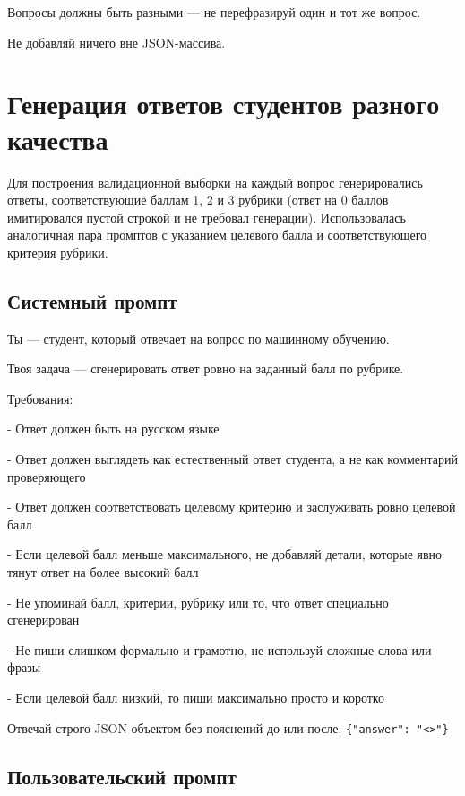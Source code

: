 \vspace{1em}
Вопросы должны быть разными — не перефразируй один и тот же
вопрос.

Не добавляй ничего вне JSON-массива.

\section{Генерация ответов студентов разного качества}
\label{app:prompts:answers}
 
Для построения валидационной выборки на каждый вопрос генерировались
ответы, соответствующие баллам 1, 2 и 3 рубрики (ответ на 0 баллов
имитировался пустой строкой и не требовал генерации). Использовалась
аналогичная пара промптов с указанием целевого балла и
соответствующего критерия рубрики.
 
\subsection{Системный промпт}
 
Ты — студент, который отвечает на вопрос по машинному обучению.
  
\vspace{1em}
Твоя задача — сгенерировать ответ ровно на заданный балл по
рубрике.
   
\vspace{1em}
Требования:

- Ответ должен быть на русском языке

- Ответ должен выглядеть как естественный ответ студента,
  а не как комментарий проверяющего

- Ответ должен соответствовать целевому критерию и заслуживать
  ровно целевой балл

- Если целевой балл меньше максимального, не добавляй детали,
  которые явно тянут ответ на более высокий балл

- Не упоминай балл, критерии, рубрику или то, что ответ
  специально сгенерирован

- Не пиши слишком формально и грамотно, не используй сложные
  слова или фразы

- Если целевой балл низкий, то пиши максимально просто и
  коротко
   
\vspace{1em}
Отвечай строго JSON-объектом без пояснений до или после:
\verb|{"answer": "<>"}|
 
\subsection{Пользовательский промпт}
 
